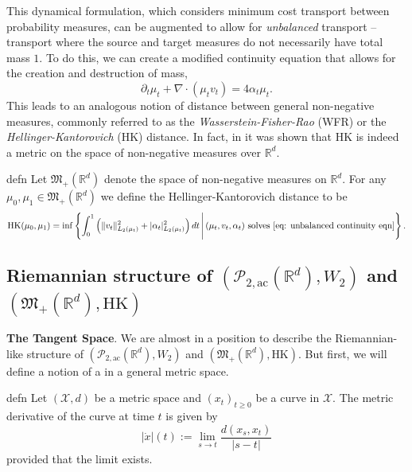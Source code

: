\documentclass{article}
\begin{document}
This dynamical formulation, which considers minimum cost transport between probability measures, can be augmented to allow for \textit{unbalanced} transport -- transport where the source and target measures do not necessarily have total mass $1$. To do this, we can create a modified continuity equation that allows for the creation and destruction of mass,
\begin{equation}
    \partial_t\mu_t + \nabla \cdot (\mu_tv_t) = 4\alpha_t\mu_t. \label{eq: unbalanced continuity eqn}
\end{equation}
This leads to an analogous notion of distance between general non-negative measures, commonly referred to as the \textit{Wasserstein-Fisher-Rao} (WFR) or the \textit{Hellinger-Kantorovich} (HK) distance. In fact, in \citet{liero2018optimal} it was shown that HK is indeed a metric on the space of non-negative measures over $\mathbb{R}^d$. 

\begin{restatable}{defn}{}
    Let $\mathfrak{M}_+(\mathbb{R}^d)$ denote the space of non-negative measures on $\mathbb{R}^d$. For any $\mu_0, \mu_1 \in \mathfrak{M}_+(\mathbb{R}^d)$ we define the Hellinger-Kantorovich distance to be
    \begin{equation}
        \text{HK}(\mu_0, \mu_1) = \inf\left\{\int_0^1 \left(\|v_t\|_{L_2(\mu_t)}^2 + |\alpha_t|_{L_2(\mu_t)}^2\right)dt \, \Bigg| \, (\mu_t, v_t,  \alpha_t) \text{ solves \cref{eq: unbalanced continuity eqn}}\right\}.
    \end{equation}
\end{restatable}

\subsection{Riemannian structure of $(\mathcal{P}_{2, \text{ac}}(\mathbb{R}^d), W_2)$ and $(\mathfrak{M}_+(\mathbb{R}^d), \text{HK})$}

\textbf{The Tangent Space}. We are almost in a position to describe the Riemannian-like structure of $(\mathcal{P}_{2, \text{ac}}(\mathbb{R}^d), W_2)$ and $(\mathfrak{M}_+(\mathbb{R}^d), \text{HK})$. But first, we will define a notion of a  in a general metric space.

\begin{restatable}{defn}{}
    Let $(\mathcal{X}, d)$ be a metric space and $(x_t)_{t \geq 0}$ be a curve in $\mathcal{X}$. The metric derivative of the curve at time $t$ is given by
    \begin{equation*}
        |\dot x|(t) := \lim_{s\rightarrow t}\frac{d(x_s, x_t)}{|s - t|}
    \end{equation*}
    provided that the limit exists. 
\end{restatable}
\end{document}
